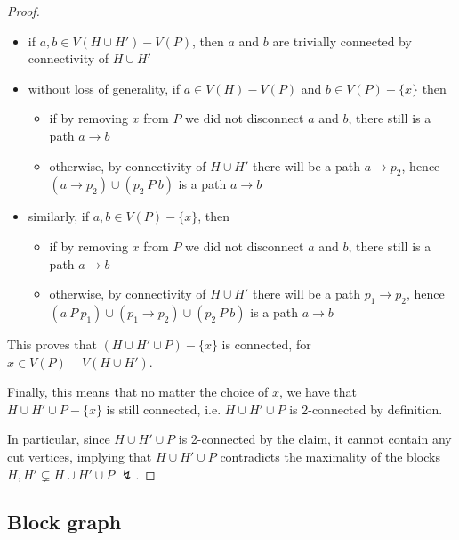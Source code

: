 \documentclass[a4paper, 12pt]{report}
\begin{document}
\begin{proof}
{\begin{itemize}
                    \begin{itemize}
                        \item if $a, b \in V(H \cup H') - V(P)$, then $a$ and $b$ are trivially connected by connectivity of $H \cup H'$
                        \item without loss of generality, if $a \in V(H) - V(P)$ and $b \in V(P) - \{x\}$ then
                            \begin{itemize}
                                \item if by removing $x$ from $P$ we did not disconnect $a$ and $b$, there still is a path $a \to b$
                                \item otherwise, by connectivity of $H \cup H'$ there will be a path $a \to p_2$, hence $(a \to p_2) \cup (p_2 \ P \ b)$ is a path $a \to b$
                            \end{itemize}
                        \item similarly, if $a, b \in V(P) - \{x\}$, then
                            \begin{itemize}
                                \item if by removing $x$ from $P$ we did not disconnect $a$ and $b$, there still is a path $a \to b$
                                \item otherwise, by connectivity of $H \cup H'$ there will be a path $p_1 \to p_2$, hence $(a \ P \ p_1) \cup (p_1 \to p_2) \cup (p_2 \ P \ b)$ is a path $a \to b$
                            \end{itemize}
                    \end{itemize}

                    This proves that $(H \cup H' \cup P) - \{x\}$ is connected, for $x \in V(P) - V(H \cup H')$.
            \end{itemize}

            Finally, this means that no matter the choice of $x$, we have that $H \cup H' \cup P - \{x\}$ is still connected, i.e. $H \cup H' \cup P$ is 2-connected by definition.
        }

        In particular, since $H \cup H' \cup P$ is 2-connected by the claim, it cannot contain any cut vertices, implying that $H \cup H' \cup P$ contradicts the maximality of the blocks $H, H' \subsetneq H \cup H' \cup P$ $\lightning$.
    \end{proof}

    \subsection{Block graph}
    
\end{document}

